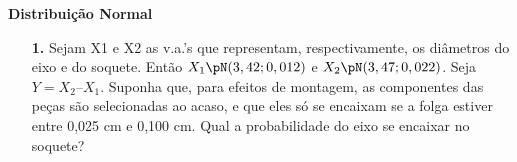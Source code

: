\begin{center}
\textbf{\LARGE{Distribuição Normal}}
\end{center}

\begin{itemize}
	\item[\textbf{1.}] Sejam X1 e X2 as v.a.’s que representam, respectivamente, os diâmetros do eixo e do soquete. Então $X_1 \pN( 3,42 ; 0,012 )$ e $X_2 \pN( 3,47 ; 0,022 ) $. Seja $Y =X_2 – X_1$. Suponha que, para efeitos de montagem, as componentes das peças são selecionadas ao acaso, e que eles só se encaixam se a folga estiver entre 0,025 cm e 0,100 cm. Qual a probabilidade do eixo se encaixar no soquete?\\
	
	

\end{itemize}
